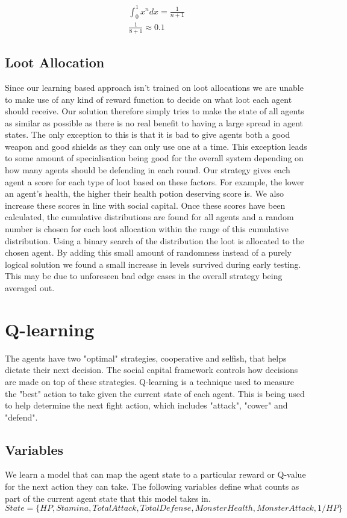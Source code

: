 \begin{align*}
\int^1_0 x^n dx = \frac{1}{n+1} \\
\frac{1}{8+1} \approx 0.1
\end{align*}

\subsection{Loot Allocation}

Since our learning based approach isn't trained on loot allocations we are unable to make use of any kind of reward function to decide on what loot each agent should receive. Our solution therefore simply tries to make the state of all agents as similar as possible as there is no real benefit to having a large spread in agent states. The only exception to this is that it is bad to give agents both a good weapon and good shields as they can only use one at a time. This exception leads to some amount of specialisation being good for the overall system depending on how many agents should be defending in each round. Our strategy gives each agent a score for each type of loot based on these factors. For example, the lower an agent's health, the higher their health potion deserving score is. We also increase these scores in line with social capital. Once these scores have been calculated, the cumulative distributions are found for all agents and a random number is chosen for each loot allocation within the range of this cumulative distribution. Using a binary search of the distribution the loot is allocated to the chosen agent. By adding this small amount of randomness instead of a purely logical solution we found a small increase in levels survived during early testing. This may be due to unforeseen bad edge cases in the overall strategy being averaged out.


\section{Q-learning}
The agents have two "optimal" strategies, cooperative and selfish, that helps dictate their next decision. The social capital framework controls how decisions are made on top of these strategies. Q-learning \cite{qlearn} is a technique used to measure the "best" action to take given the current state of each agent. This is being used to help determine the next fight action, which includes "attack", "cower" and "defend". 

\subsection{Variables}
We learn a model that can map the agent state to a particular reward or Q-value for the next action they can take. The following variables define what counts as part of the current agent state that this model takes in.
\begin{equation}
    State = \{HP, Stamina, TotalAttack, TotalDefense, MonsterHealth, MonsterAttack, 1/HP \}
\end{equation}

